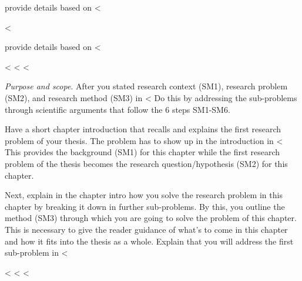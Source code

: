 {{{provide details based on <%

<%

provide details based on <%

<%
<%
<%

\emph{Purpose and scope}.
After you stated research context (SM1), research problem (SM2), and research method (SM3) in <%
Do this by addressing the sub-problems through scientific arguments that follow the 6 steps SM1-SM6.

Have a short chapter introduction that recalls and explains the first research problem of your thesis.
The problem has to show up in the introduction in <%
This provides the background (SM1) for this chapter while the first research problem of the thesis becomes the research question/hypothesis (SM2) for this chapter.

Next, explain in the chapter intro how you solve the research problem in this chapter by breaking it down in further sub-problems.
By this, you outline the method (SM3) through which you are going to solve the problem of this chapter.
This is necessary to give the reader guidance of what's to come in this chapter and how it fits into the thesis as a whole.
Explain that you will address the first sub-problem in <%

<%
<%
<%

}}}

